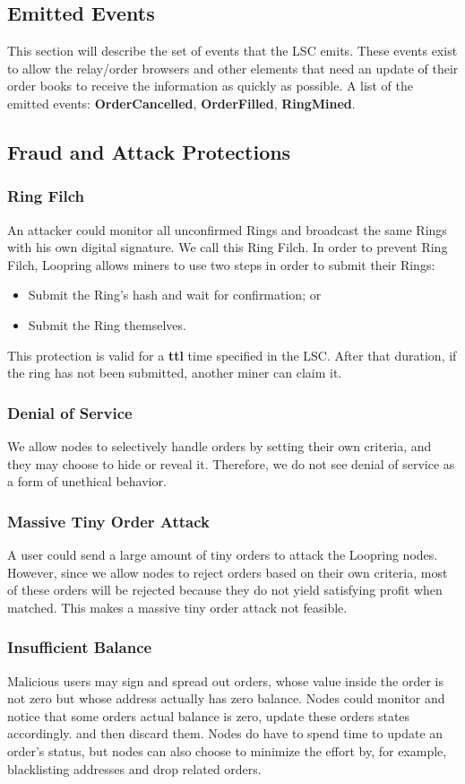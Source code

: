 \documentclass[UTF8,nofonts]{article}
\begin{document}
\subsection{Emitted Events}
This section will describe the set of events that the LSC emits. These events exist to allow the relay/order browsers and other elements that need an update of their order books to receive the information as quickly as possible.
A list of the emitted events: \textbf{OrderCancelled}, \textbf{OrderFilled}, \textbf{RingMined}.

\subsection{Fraud and Attack Protections}
\subsubsection{Ring Filch}
An attacker could monitor all unconfirmed Rings and broadcast the same Rings with his own digital signature. We call this Ring Filch. In order to prevent Ring Filch, Loopring allows miners to use two steps in order to submit their Rings:
\begin{itemize}
	\item Submit the Ring’s hash and wait for confirmation; or
	\item Submit the Ring themselves.
\end{itemize}
This protection is valid for a \textbf{ttl} time specified in the LSC. After that duration, if the ring has not been submitted, another miner can claim it.
\subsubsection{Denial of Service}
We allow nodes to selectively handle orders by setting their own criteria, and they may choose to hide or reveal it. Therefore, we do not see denial of service as a form of unethical behavior.
\subsubsection{Massive Tiny Order Attack}
A user could send a large amount of tiny orders to attack the Loopring nodes. However, since we allow nodes to reject orders based on their own criteria, most of these orders will be rejected because they do not yield satisfying profit when matched. This makes a massive tiny order attack not feasible.

\subsubsection{Insufficient Balance}
Malicious users may sign and spread out orders, whose value inside the order is not zero but whose address actually has zero balance. Nodes could monitor and notice that some orders actual balance is zero, update these orders states accordingly. and then discard them.
Nodes do have to spend time to update an order’s status, but nodes can also choose to minimize the effort by, for example, blacklisting addresses and drop related orders.
\end{document}
